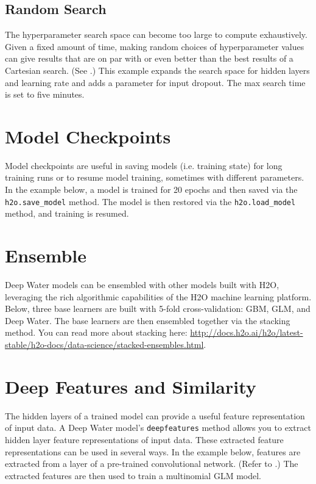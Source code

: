 	\newpage
	\subsection{Random Search}
		The hyperparameter search space can become too large to compute exhaustively. Given a fixed amount of time, making random choices of hyperparameter values can give results that are on par with or even better than the best results of a Cartesian search. (See \textit{} \cite{bergstra-bengio}.) This example expands the search space for hidden layers and learning rate and adds a parameter for input dropout. The max search time is set to five minutes.
		
\waterExampleInPython


\section{Model Checkpoints}
Model checkpoints are useful in saving models (i.e. training state) for long training runs or to resume model training, sometimes with different parameters.  In the example below, a model is trained for 20 epochs and then saved via the \texttt{h2o.save\_model} method.  The model is then restored via the \texttt{h2o.load\_model} method, and training is resumed.

\waterExampleInPython


\newpage
\section{Ensemble}
Deep Water models can be ensembled with other models built with H2O, leveraging the rich algorithmic capabilities of the H2O machine learning platform.  Below, three base learners are built with 5-fold cross-validation: GBM, GLM, and Deep Water. The base learners are then ensembled together via the stacking method. You can read more about stacking here: {\url{http://docs.h2o.ai/h2o/latest-stable/h2o-docs/data-science/stacked-ensembles.html}}.

\waterExampleInPython


\newpage
\section{Deep Features and Similarity}
The hidden layers of a trained model can provide a useful feature representation of input data.  A Deep Water model's \texttt{deepfeatures} method allows you to extract hidden layer feature representations of input data.  These extracted feature representations can be used in several ways.  In the example below, features are extracted from a layer of a pre-trained convolutional network. (Refer to \textit{} \cite{inceptionbn}.)  The extracted features are then used to train a multinomial GLM model.

